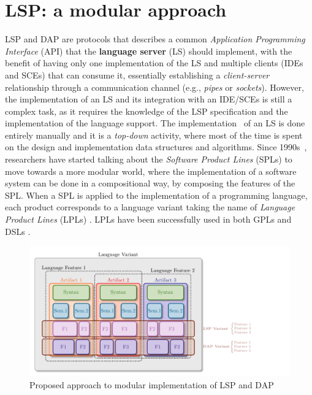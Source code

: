 \section{LSP: a modular approach}\label{sec:concept:LSPAModularApproach}

LSP and DAP are protocols that describes a common \textit{Application Programming Interface} (API) that the \textbf{language server} (LS) should implement, with the benefit of having only one implementation of the LS and multiple clients (IDEs and SCEs) that can consume it, essentially establishing a \textit{client-server} relationship through a communication channel (e.g., \textit{pipes} or \textit{sockets}).
However, the implementation of an LS and its integration with an IDE/SCEs is still a complex task, as it requires the knowledge of the LSP specification and the implementation of the language support.
The implementation~\cite{Gunasinghe22} of an LS is done entirely manually and it is a \textit{top-down} activity, where most of the time is spent on the design and implementation data structures and algorithms.
Since 1990s~\cite{Kang90}, researchers have started talking about the \textit{Software Product Lines} (SPLs) \cite{Cazzola23d, Cazzola20} to move towards a more modular world, where the implementation of a software system can be done in a compositional way, by composing the features of the SPL.
When a SPL is applied to the implementation of a programming language, each product corresponds to a language variant \cite{Cazzola15f} taking the name of \textit{Language Product Lines} (LPLs) \cite{Cazzola15f}. LPLs have been successfully used in both GPLs \cite{Cazzola16, Cazzola16i, Cazzola15f} and DSLs \cite{Haugen08, Cazzola14e, White09}.
\begin{figure}[t]
    \centering
    \includegraphics[width=0.9\linewidth]{figs/concept/module_with_lsp.pdf}
    \caption{Proposed approach to modular implementation of LSP and DAP}
    \label{lst:concept:module_with_lsp}
\end{figure}

